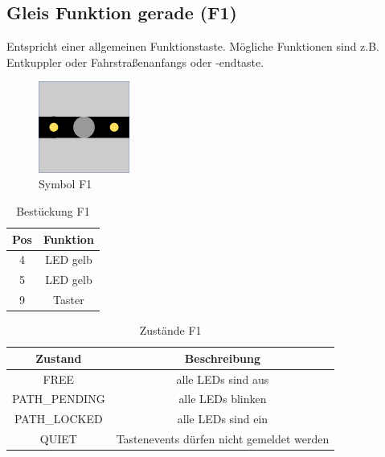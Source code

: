 \documentclass[10pt,a4paper]{article}
\begin{document}
\subsection{Gleis Funktion gerade (F1)}
Entspricht einer allgemeinen Funktionstaste. Mögliche Funktionen sind z.B. Entkuppler oder Fahrstraßenanfangs oder -endtaste.
\begin{figure}[hbtp]
\centering
\includegraphics[width=3cm]{../folien/f1.png}
\caption{Symbol F1}
\end{figure}
\begin{table}[h!]
\centering
\begin{tabular}{c|c}
\textbf{Pos} & \textbf{Funktion} \\ \hline
4 & LED gelb \\
5 & LED gelb \\
9 & Taster
\end{tabular}
\caption{Bestückung F1}
\end{table}
\begin{table}[h!]
\centering
\begin{tabular}{c|c}
\textbf{Zustand} & \textbf{Beschreibung} \\ \hline
FREE & alle LEDs sind aus \\
PATH\_PENDING & alle LEDs blinken \\
PATH\_LOCKED & alle LEDs sind ein \\
QUIET & Tastenevents dürfen nicht gemeldet werden
\end{tabular}
\caption{Zustände F1}
\end{table}

\newpage
\end{document}
